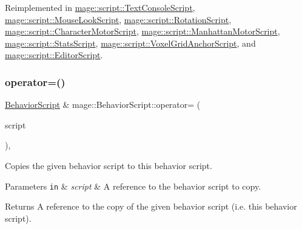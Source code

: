 Reimplemented in \mbox{\hyperlink{classmage_1_1script_1_1_text_console_script_a1e5a7bdff2d47b835932d7220a4e2571}{mage\+::script\+::\+Text\+Console\+Script}}, \mbox{\hyperlink{classmage_1_1script_1_1_mouse_look_script_a00c8dc8ebaf67da13bd0bc45de3ad8b6}{mage\+::script\+::\+Mouse\+Look\+Script}}, \mbox{\hyperlink{classmage_1_1script_1_1_rotation_script_a7da4165e899facc981c0ee5b1f4a4453}{mage\+::script\+::\+Rotation\+Script}}, \mbox{\hyperlink{classmage_1_1script_1_1_character_motor_script_a20699adf280bed4bfadd4a89d7df33c1}{mage\+::script\+::\+Character\+Motor\+Script}}, \mbox{\hyperlink{classmage_1_1script_1_1_manhattan_motor_script_ac93b09e8f82932f7071b1f591a8004e9}{mage\+::script\+::\+Manhattan\+Motor\+Script}}, \mbox{\hyperlink{classmage_1_1script_1_1_stats_script_a4bfada754da5ca76591c5e7b9b0b1f51}{mage\+::script\+::\+Stats\+Script}}, \mbox{\hyperlink{classmage_1_1script_1_1_voxel_grid_anchor_script_aca9d52f124cbedfe7daade62366d4c0a}{mage\+::script\+::\+Voxel\+Grid\+Anchor\+Script}}, and \mbox{\hyperlink{classmage_1_1script_1_1_editor_script_af0804c603852f556d362f43e69240b2d}{mage\+::script\+::\+Editor\+Script}}.

\mbox{\label{classmage_1_1_behavior_script_adb153676123adadacf023e4f3804abf5}} 
\subsubsection{\texorpdfstring{operator=()}{operator=()}\hspace{0.1cm}{\footnotesize\ttfamily [1/2]}}
{\footnotesize\ttfamily \mbox{\hyperlink{classmage_1_1_behavior_script}{Behavior\+Script}} \& mage\+::\+Behavior\+Script\+::operator= (\begin{DoxyParamCaption}\item[{const \mbox{\hyperlink{classmage_1_1_behavior_script}{Behavior\+Script}} \&}]{script }\end{DoxyParamCaption})\hspace{0.3cm}{\ttfamily [default]}, {\ttfamily [noexcept]}}

Copies the given behavior script to this behavior script.


\begin{DoxyParams}[1]{Parameters}
\mbox{\tt in}  & {\em script} & A reference to the behavior script to copy. \\
\hline
\end{DoxyParams}
\begin{DoxyReturn}{Returns}
A reference to the copy of the given behavior script (i.\+e. this behavior script). 
\end{DoxyReturn}
\mbox{\label{classmage_1_1_behavior_script_aefeae227ee8d2452bf05782604f5011e}} 
